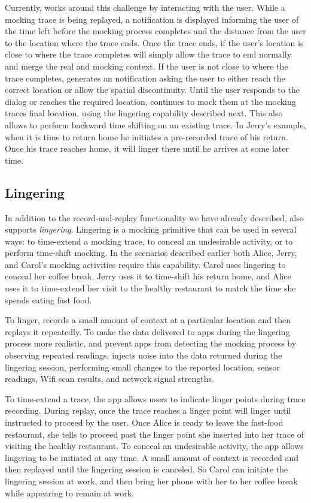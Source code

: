 Currently, \PocketMocker{} works around this challenge by interacting with the
user. While a mocking trace is being replayed, a notification is displayed
informing the user of the time left before the mocking process completes and
the distance from the user to the location where the trace ends. Once the
trace ends, if the user's location is close to where the trace completes
\PocketMocker{} will simply allow the trace to end normally and merge the
real and mocking context. If the user is not close to where the trace
completes, \PocketMocker{} generates an notification asking the user to
either reach the correct location or allow the spatial discontinuity. Until
the user responds to the dialog or reaches the required location,
\PocketMocker{} continues to mock them at the mocking traces final location,
using the lingering capability described next. This also allows
\PocketMocker{} to perform backward time shifting on an existing trace. In
Jerry's example, when it is time to return home he initiates a pre-recorded
trace of his return. Once his trace reaches home, it will linger there until
he arrives at some later time.

\subsection{Lingering}

In addition to the record-and-replay functionality we have already described,
\PocketMocker{} also supports \textit{lingering}. Lingering is a mocking
primitive that can be used in several ways: to time-extend a mocking trace,
to conceal an undesirable activity, or to perform time-shift mocking. In the
scenarios described earlier both Alice, Jerry, and Carol's mocking activities
require this capability. Carol uses lingering to conceal her coffee break,
Jerry uses it to time-shift his return home, and Alice uses it to time-extend
her visit to the healthy restaurant to match the time she spends eating fast
food.

To linger, \PocketMocker{} records a small amount of context at a particular
location and then replays it repeatedly. To make the data delivered to apps
during the lingering process more realistic, and prevent apps from detecting
the mocking process by observing repeated readings, \PocketMocker{} injects
noise into the data returned during the lingering session, performing small
changes to the reported location, sensor readings, Wifi scan results, and
network signal strengths.

To time-extend a trace, the app allows users to indicate linger points during
trace recording. During replay, once the trace reaches a linger point
\PocketMocker{} will linger until instructed to proceed by the user. Once
Alice is ready to leave the fast-food restaurant, she tells \PocketMocker{}
to proceed past the linger point she inserted into her trace of visiting the
healthy restaurant. To conceal an undesirable activity, the \PocketMocker{}
app allows lingering to be initiated at any time. A small amount of context
is recorded and then replayed until the lingering session is canceled. So
Carol can initiate the lingering session at work, and then bring her phone
with her to her coffee break while appearing to remain at work.

